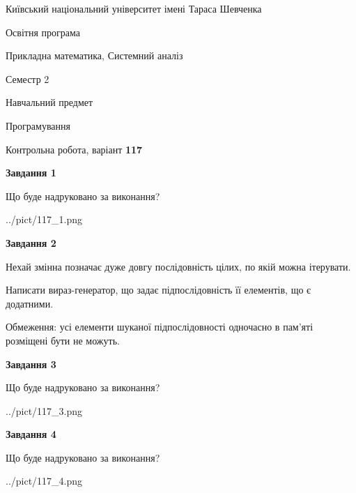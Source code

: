 \documentclass[12pt, ukrainian]{article}
\begin{document}
{{\begin {small}\par
{ \center  Київський національний університет імені Тараса Шевченка \par}
{\parbox {5 cm}{Освітня програма \hfill}{\parbox {8 cm}{Прикладна математика, Системний аналіз \hfill}}\parbox {5 cm}{\hfill Семестр 2}}\par
{\parbox {5 cm} {Навчальний предмет \hfill}\parbox {7 cm}{Програмування \hfill}\parbox {6cm}{\hfill}\par}\vspace{-7pt} \end{small}}{\center Контрольна робота, варіант  \No \textbf
{ 117 }\par}}
{
\begin {large}
{\begin {center}\textbf{Завдання 1}\end {center}}\par
Що буде надруковано за виконання?\par\par
\begin{center}
	{../pict/117_1.png}
\end{center}
\newpage

{\begin {center}\textbf{Завдання 2}\end {center}}\par
Нехай змінна  позначає дуже довгу послідовність цілих, по якій можна ітерувати.

Написати вираз-генератор, що задає підпослідовність її елементів, що є додатни\-ми.

Обмеження: усі елементи шуканої підпослідовності одночасно в пам'яті розміщені бути не можуть.\par
\newpage

{\begin {center}\textbf{Завдання 3}\end {center}}\par
Що буде надруковано за виконання?\par
\begin{center}
	{../pict/117_3.png}
\end{center}
\newpage

{\begin {center}\textbf{Завдання 4}\end {center}}\par
Що буде надруковано за виконання?\par
\begin{center}
	{../pict/117_4.png}
\end{center}
\newpage


\end{large}}
\end{document}
